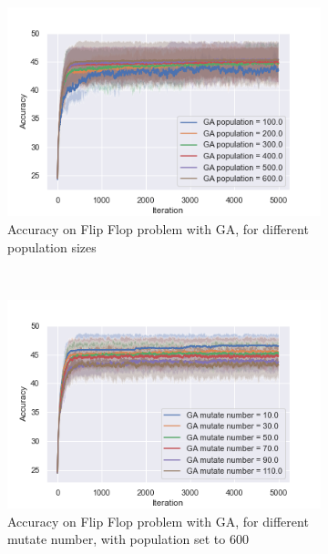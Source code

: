 \documentclass[10pt]{article}
\begin{document}
				\begin{figure}[h]
					\centering
					\begin{subfigure}[t]{0.32\columnwidth}
						\centering
						\includegraphics[width=\linewidth]{../graphics/flip_flop_GA_Iteration_Error_GA_population.png}
						\caption{Accuracy on Flip Flop problem with GA, for different population sizes}
						\label{ff:ga_pop}
					\end{subfigure}
					~
					\begin{subfigure}[t]{0.32\columnwidth}
						\centering
						\includegraphics[width=\linewidth]{../graphics/flip_flop_GA_Iteration_Error_GA_mutate_number.png}
						\caption{Accuracy on Flip Flop problem with GA, for different mutate number, with population set to 600}
						\label{ff:ga_mutate}
					\end{subfigure}
					~
					\begin{subfigure}[t]{0.32\columnwidth}

\end{subfigure}
\end{figure}
\end{document}
